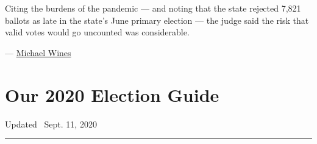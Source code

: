 Citing the burdens of the pandemic --- and noting that the state
rejected 7,821 ballots as late in the state's June primary election ---
the judge said the risk that valid votes would go uncounted was
considerable.

--- \href{https://www.nytimes3xbfgragh.onion/by/michael-wines}{Michael
Wines}

\hypertarget{our-2020-election-guide}{%
\section{Our 2020 Election Guide}\label{our-2020-election-guide}}

Updated ~Sept. 11, 2020

\begin{center}\rule{0.5\linewidth}{\linethickness}\end{center}

